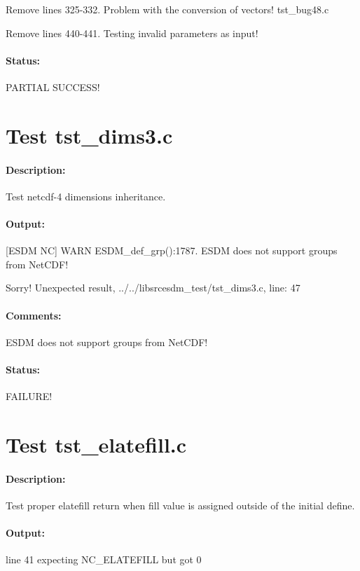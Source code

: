 Remove lines 325-332. Problem with the conversion of vectors! tst\_bug48.c

Remove lines 440-441. Testing invalid parameters as input!

\paragraph{Status:} PARTIAL SUCCESS!

\section{Test tst\_dims3.c}

\paragraph{Description:} Test netcdf-4 dimensions inheritance.

\paragraph{Output:} [ESDM NC] WARN ESDM\_def\_grp():1787. ESDM does not support groups from NetCDF!

Sorry! Unexpected result, ../../libsrcesdm\_test/tst\_dims3.c, line: 47

\paragraph{Comments:} ESDM does not support groups from NetCDF!

\paragraph{Status:} FAILURE!

\section{Test tst\_elatefill.c}

\paragraph{Description:} Test proper elatefill return when fill value is assigned outside of the initial define.

\paragraph{Output:} line 41 expecting NC\_ELATEFILL but got 0

